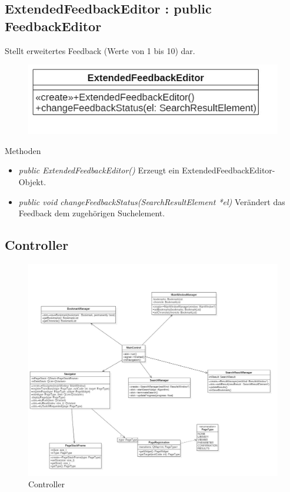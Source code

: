 \subsection*{ExtendedFeedbackEditor : public FeedbackEditor}
Stellt erweitertes Feedback (Werte von 1 bis 10) dar.

\begin{figure}[H]
	\centering
	\includegraphics[scale=0.5]{img/Klassendiagramm/Klassen/View/ExtendedFeedbackEditor}
	\label{fig:ExtendedFeedbackEditor}
\end{figure}

Methoden
\begin{itemize}
	\item\textit{public ExtendedFeedbackEditor()}
	Erzeugt ein ExtendedFeedbackEditor-Objekt.
	\item\textit{public void changeFeedbackStatus(SearchResultElement *el)}
	Verändert das Feedback dem zugehörigen Suchelement.
\end{itemize}

\pagebreak

\subsection{Controller}

\begin{figure}[H]
\includegraphics[width=1\linewidth]{img/Klassendiagramm/Controller}
\caption{Controller}
\label{fig:controller}
\end{figure}


